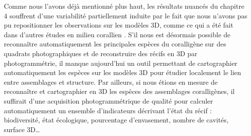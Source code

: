 Comme nous l’avons déjà mentionné plus haut, les résultats nuancés du chapitre 4 souffrent d’une variabilité partiellement induite par le fait que nous n’avons pas pu repositionner les observations sur les modèles 3D, comme ce qui a été fait dans d’autres études en milieu corallien \citep{burns_3d_2019, price_using_2019, carlot_community_2020}. S’il nous est désormais possible de reconnaître automatiquement les principales espèces du coralligène sur des quadrats photographiques et de reconstruire des récifs en 3D par photogrammétrie, il manque aujourd’hui un outil permettant de cartographier automatiquement les espèces sur les modèles 3D pour étudier localement le lien entre assemblages et structure. Par ailleurs, si nous étions en mesure de reconnaître et cartographier en 3D les espèces des assemblages coralligènes, il suffirait d’une acquisition photogrammétrique de qualité pour calculer automatiquement un ensemble d’indicateurs décrivant l’état du récif : biodiversité, état écologique, pourcentage d’envasement, nombre de cavités, surface 3D… 

